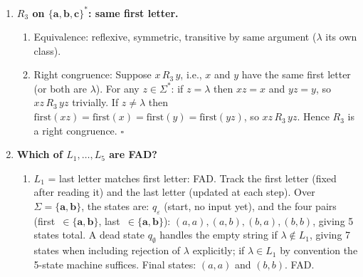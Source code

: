 \begin{enumerate}[{2.}1.]
\begin{enumerate}
\item Equivalence: Reflexive ($x$ ends with same letter as $x$). Symmetric (same). Transitive (same). But for $\lambda$: $\lambda$ has no last letter. By convention, $\lambda$ is in its own class (or we restrict to $\Sigma^+$). Assuming $\lambda$ is its own class: $\lambda\,R_2\,\lambda$, and for $x,y\in\Sigma^+$, $x\,R_2\,y\Leftrightarrow$ last$(x)=$last$(y)$.

\item Right congruence: If $x\,R_2\,y$ (same last letter, say $c$), then for any $z\in\Sigma^+$: last$(xz)=$last$(z)=$last$(yz)$, so $xz\,R_2\,yz$. For $z=\lambda$: $x\,R_2\,y$. $\square$
\end{enumerate}

\item \textbf{$R_3$ on $\{\mathbf{a},\mathbf{b},\mathbf{c}\}^*$: same first letter.}

\begin{enumerate}
\item Equivalence: reflexive, symmetric, transitive by same argument ($\lambda$ its own class).

\item Right congruence: Suppose $x\,R_3\,y$, i.e., $x$ and $y$ have the same first letter (or both are $\lambda$). For any $z\in\Sigma^*$: if $z=\lambda$ then $xz=x$ and $yz=y$, so $xz\,R_3\,yz$ trivially. If $z\neq\lambda$ then $\text{first}(xz)=\text{first}(x)=\text{first}(y)=\text{first}(yz)$, so $xz\,R_3\,yz$. Hence $R_3$ is a right congruence. $\square$
\end{enumerate}

\item \textbf{Which of $L_1,\ldots,L_5$ are FAD?}

\begin{enumerate}
\item $L_1$ = last letter matches first letter: FAD. Track the first letter (fixed after reading it) and the last letter (updated at each step). Over $\Sigma=\{\mathbf{a},\mathbf{b}\}$, the states are: $q_\varepsilon$ (start, no input yet), and the four pairs (first~$\in\{\mathbf{a},\mathbf{b}\}$, last~$\in\{\mathbf{a},\mathbf{b}\}$): $(a,a),(a,b),(b,a),(b,b)$, giving 5 states total. A dead state $q_\emptyset$ handles the empty string if $\lambda\notin L_1$, giving 7 states when including rejection of $\lambda$ explicitly; if $\lambda\in L_1$ by convention the 5-state machine suffices. Final states: $(a,a)$ and $(b,b)$. FAD.


\end{enumerate}
\end{enumerate}
